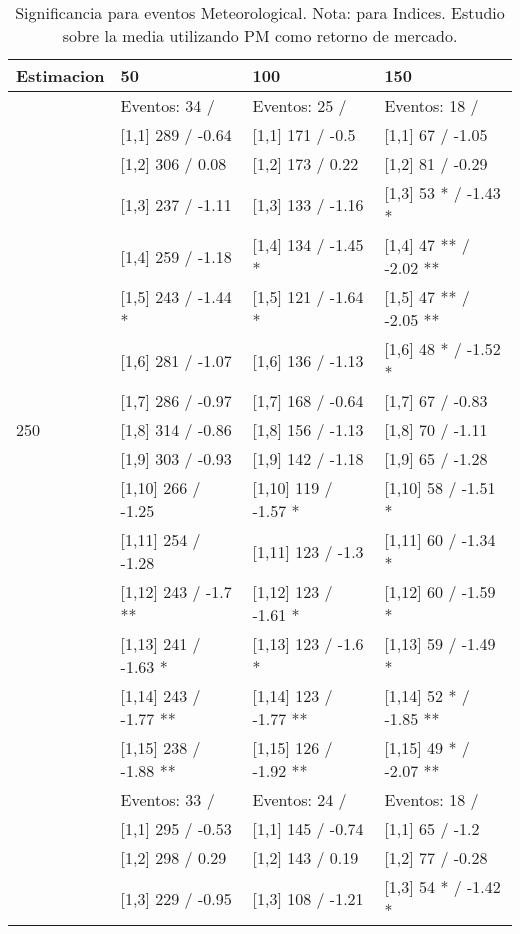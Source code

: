 \begin{table}

\caption{Significancia para eventos Meteorological. Nota: para Indices. Estudio sobre la media utilizando PM como retorno de mercado.}
\centering
\begin{tabular}[t]{llll}
\toprule
Estimacion & 50 & 100 & 150\\
\midrule
 & Eventos:  34 / & Eventos:  25 / & Eventos:  18 /\\
 & {}[1,1] 289  / -0.64 & {}[1,1] 171  / -0.5 & {}[1,1] 67  / -1.05\\
 & {}[1,2] 306  / 0.08 & {}[1,2] 173  / 0.22 & {}[1,2] 81  / -0.29\\
 & {}[1,3] 237  / -1.11 & {}[1,3] 133  / -1.16 & {}[1,3] 53 * / -1.43 *\\
 & {}[1,4] 259  / -1.18 & {}[1,4] 134  / -1.45 * & {}[1,4] 47 ** / -2.02 **\\
\addlinespace
 & {}[1,5] 243  / -1.44 * & {}[1,5] 121  / -1.64 * & {}[1,5] 47 ** / -2.05 **\\
 & {}[1,6] 281  / -1.07 & {}[1,6] 136  / -1.13 & {}[1,6] 48 * / -1.52 *\\
 & {}[1,7] 286  / -0.97 & {}[1,7] 168  / -0.64 & {}[1,7] 67  / -0.83\\
250 & {}[1,8] 314  / -0.86 & {}[1,8] 156  / -1.13 & {}[1,8] 70  / -1.11\\
 & {}[1,9] 303  / -0.93 & {}[1,9] 142  / -1.18 & {}[1,9] 65  / -1.28\\
\addlinespace
 & {}[1,10] 266  / -1.25 & {}[1,10] 119  / -1.57 * & {}[1,10] 58  / -1.51 *\\
 & {}[1,11] 254  / -1.28 & {}[1,11] 123  / -1.3 & {}[1,11] 60  / -1.34 *\\
 & {}[1,12] 243  / -1.7 ** & {}[1,12] 123  / -1.61 * & {}[1,12] 60  / -1.59 *\\
 & {}[1,13] 241  / -1.63 * & {}[1,13] 123  / -1.6 * & {}[1,13] 59  / -1.49 *\\
 & {}[1,14] 243  / -1.77 ** & {}[1,14] 123  / -1.77 ** & {}[1,14] 52 * / -1.85 **\\
\addlinespace
 & {}[1,15] 238  / -1.88 ** & {}[1,15] 126  / -1.92 ** & {}[1,15] 49 * / -2.07 **\\
 & Eventos:  33 / & Eventos:  24 / & Eventos:  18 /\\
 & {}[1,1] 295  / -0.53 & {}[1,1] 145  / -0.74 & {}[1,1] 65  / -1.2\\
 & {}[1,2] 298  / 0.29 & {}[1,2] 143  / 0.19 & {}[1,2] 77  / -0.28\\
 & {}[1,3] 229  / -0.95 & {}[1,3] 108  / -1.21 & {}[1,3] 54 * / -1.42 *\\

\end{tabular}
\end{table}
